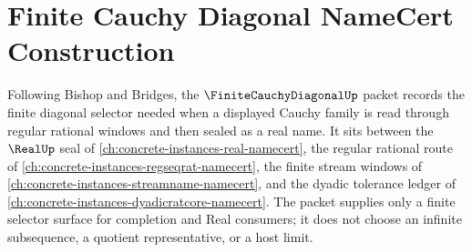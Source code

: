 \chapter{Finite Cauchy Diagonal NameCert Construction}
\label{ch:concrete-instances-finite-cauchy-diagonal-namecert}

Following Bishop and Bridges, the $\FiniteCauchyDiagonalUp$ packet records the finite diagonal selector needed when a displayed Cauchy family is read through regular rational windows and then sealed as a real name. It sits between the $\RealUp$ seal of \autoref{ch:concrete-instances-real-namecert}, the regular rational route of \autoref{ch:concrete-instances-regseqrat-namecert}, the finite stream windows of \autoref{ch:concrete-instances-streamname-namecert}, and the dyadic tolerance ledger of \autoref{ch:concrete-instances-dyadicratcore-namecert}. The packet supplies only a finite selector surface for completion and Real consumers; it does not choose an infinite subsequence, a quotient representative, or a host limit.

